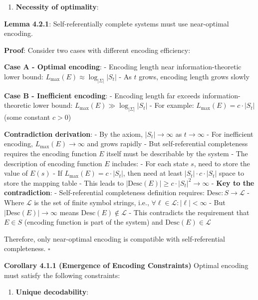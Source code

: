 \begin{enumerate}
\item \textbf{Necessity of optimality}:
\end{enumerate}
   
   \textbf{Lemma 4.2.1}: Self-referentially complete systems must use near-optimal encoding.
\label{thm:2.4}
   
   \textbf{Proof}:
   Consider two cases with different encoding efficiency:
   
   \textbf{Case A - Optimal encoding}:
   - Encoding length near information-theoretic lower bound: $L_{\max}(E) \approx \log_{|\Sigma|} |S_t|$
   - As $t$ grows, encoding length grows slowly
   
   \textbf{Case B - Inefficient encoding}:
   - Encoding length far exceeds information-theoretic lower bound: $L_{\max}(E) \gg \log_{|\Sigma|} |S_t|$
   - For example: $L_{\max}(E) = c \cdot |S_t|$ (some constant $c > 0$)
   
   \textbf{Contradiction derivation}:
   - By the axiom, $|S_t| \to \infty$ as $t \to \infty$
   - For inefficient encoding, $L_{\max}(E) \to \infty$ and grows rapidly
   - But self-referential completeness requires the encoding function $E$ itself must be describable by the system
   - The description of encoding function $E$ includes:
     - For each state $s$, need to store the value of $E(s)$
     - If $L_{\max}(E) = c \cdot |S_t|$, then need at least $|S_t| \cdot c \cdot |S_t|$ space to store the mapping table
     - This leads to $|\text{Desc}(E)| \geq c \cdot |S_t|^2 \to \infty$
   - \textbf{Key to the contradiction}:
     - Self-referential completeness definition requires: $\text{Desc}: S \to \mathcal{L}$
     - Where $\mathcal{L}$ is the set of finite symbol strings, i.e., $\forall \ell \in \mathcal{L}: |\ell| < \infty$
     - But $|\text{Desc}(E)| \to \infty$ means $\text{Desc}(E) \notin \mathcal{L}$
     - This contradicts the requirement that $E \in S$ (encoding function is part of the system) and $\text{Desc}(E) \in \mathcal{L}$
   
   Therefore, only near-optimal encoding is compatible with self-referential completeness. $\square$

\textbf{Corollary 4.1.1 (Emergence of Encoding Constraints)}
\label{thm:2.2}
Optimal encoding must satisfy the following constraints:

\begin{enumerate}
\item \textbf{Unique decodability}:
\end{enumerate}
   
